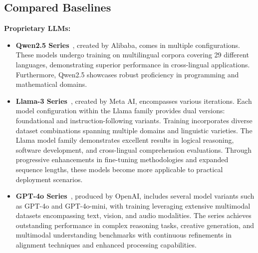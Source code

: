 \subsection{Compared Baselines}
\label{app:baseline}
\textbf{Proprietary LLMs:}
\begin{itemize}[leftmargin=1em]

\item \textbf{Qwen2.5 Series}~\citep{yang2024qwen2.5}, created by Alibaba, comes in multiple configurations. These models undergo training on multilingual corpora covering 29 different languages, demonstrating superior performance in cross-lingual applications. Furthermore, Qwen2.5 showcases robust proficiency in programming and mathematical domains. 


\item \textbf{Llama-3 Series}~\citep{dubey2024llama}, created by Meta AI, encompasses various iterations. Each model configuration within the Llama family provides dual versions: foundational and instruction-following variants. Training incorporates diverse dataset combinations spanning multiple domains and linguistic varieties. The Llama model family demonstrates excellent results in logical reasoning, software development, and cross-lingual comprehension evaluations. Through progressive enhancements in fine-tuning methodologies and expanded sequence lengths, these models become more applicable to practical deployment scenarios.

\item \textbf{GPT-4o Series}~\citep{hurst2024gpt}, produced by OpenAI, includes several model variants such as GPT-4o and GPT-4o-mini, with training leveraging extensive multimodal datasets encompassing text, vision, and audio modalities. The series achieves outstanding performance in complex reasoning tasks, creative generation, and multimodal understanding benchmarks with continuous refinements in alignment techniques and enhanced processing capabilities.
\end{itemize}

